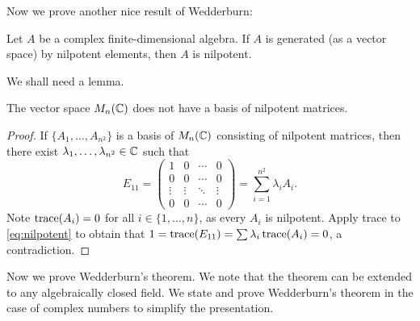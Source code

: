 Now we prove another nice result of Wedderburn:

\begin{theorem}[Wedderburn]
\label{thm:Wedderburn}
    Let $A$ be a complex finite-dimensional 
    algebra. If $A$ is generated (as a vector space) 
    by nilpotent elements, then $A$ is nilpotent. 
\end{theorem}

We shall need a lemma.

\begin{lemma}
    The vector space $M_n(\mathbb{C})$ does not have a basis of nilpotent matrices. 
\end{lemma}

\begin{proof}
    If $\{A_1,\dots,A_{n^2}\}$ is a basis of 
    $M_n(\mathbb{C})$ consisting of nilpotent matrices, 
    then there exist $\lambda_1,\dots,\lambda_{n^2}\in\mathbb{C}$ such that 
    \begin{equation}
        \label{eq:nilpotent}
        E_{11}=\begin{pmatrix}
        1&0&\cdots&0\\
        0&0&\cdots&0\\
        \vdots&\vdots&\ddots&\vdots\\
        0&0&\cdots&0
        \end{pmatrix}
        =\sum_{i=1}^{n^2}\lambda_iA_i.
    \end{equation}
    Note $\operatorname{trace}(A_i)=0$ for all $i\in\{1,\dots,n\}$, as 
    every $A_i$ is nilpotent. 
    Apply trace to \eqref{eq:nilpotent} to 
    obtain that $1=\operatorname{trace}(E_{11})=\sum\lambda_i\operatorname{trace}(A_i)=0$, a contradiction. 
\end{proof}

Now we prove Wedderburn's theorem. We note that
the theorem can be extended to any algebraically closed field. We 
state and prove Wedderburn's theorem in the case of complex numbers
to simplify the presentation. 

